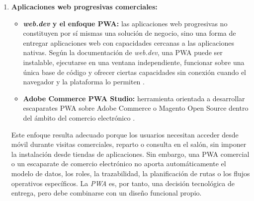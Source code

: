 \begin{enumerate}[label=\textbf{\arabic*.}, leftmargin=1.1cm, itemsep=0.6em, topsep=0.35em]
  Estas aplicaciones son relevantes porque se dirigen al mismo entorno profesional de peluquerías y salones. Sin embargo, su usuario principal es el propio salón, no el distribuidor de productos. Su núcleo funcional se centra en reservas, agenda, caja y relación entre salón y cliente final. Por ello, no cubren de forma natural la gestión de rutas comerciales del distribuidor, el pedido de producto profesional entre empresas, el reparto físico, la relación comercial con múltiples peluquerías o la coordinación con sistemas de facturación externos.

  \item \textbf{Aplicaciones web progresivas comerciales:}
  \begin{itemize}[topsep=0.1em, itemsep=0.15em]
    \item \textbf{\textit{web.dev} y el enfoque PWA:} las aplicaciones web progresivas no constituyen por sí mismas una solución de negocio, sino una forma de entregar aplicaciones web con capacidades cercanas a las aplicaciones nativas. Según la documentación de \textit{web.dev}, una PWA puede ser instalable, ejecutarse en una ventana independiente, funcionar sobre una única base de código y ofrecer ciertas capacidades sin conexión cuando el navegador y la plataforma lo permiten \citep{webdev-pwa}.
    \item \textbf{Adobe Commerce PWA Studio:} herramienta orientada a desarrollar escaparates PWA sobre Adobe Commerce o Magento Open Source dentro del ámbito del comercio electrónico \citep{adobe-pwa-studio}.
  \end{itemize}

  Este enfoque resulta adecuado porque los usuarios necesitan acceder desde móvil durante visitas comerciales, reparto o consulta en el salón, sin imponer la instalación desde tiendas de aplicaciones. Sin embargo, una PWA comercial o un escaparate de comercio electrónico no aporta automáticamente el modelo de datos, los roles, la trazabilidad, la planificación de rutas o los flujos operativos específicos. La \textit{PWA} es, por tanto, una decisión tecnológica de entrega, pero debe combinarse con un diseño funcional propio.


\end{enumerate}
